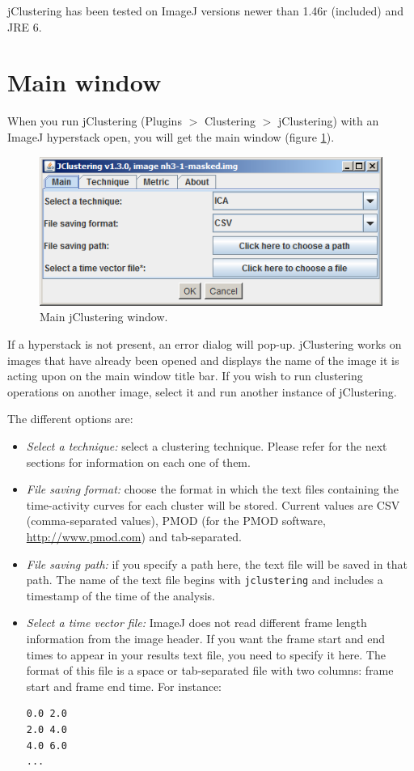 \documentclass[11pt]{article} %
\begin{document}
jClustering has been tested on ImageJ versions newer than 1.46r (included) and JRE 6.

\section{Main window}

When you run jClustering (Plugins $>$ Clustering $>$ jClustering) with an ImageJ hyperstack open, you will get the main
window (figure \ref{fig:main}).

\begin{figure}[h!]
  \centering
    \includegraphics[width=\textwidth]{figures/main_window}
  \caption{Main jClustering window.}
  \label{fig:main}
\end{figure}

If a hyperstack is not present, an error dialog will pop-up. jClustering works on images that have already been opened and
displays the name of the image it is acting upon on the main window title bar. If you wish to run clustering operations on
another image, select it and run another instance of jClustering.

The different options are:

\begin{itemize}
\item {\em Select a technique:} select a clustering technique. Please refer for the next sections for information on each one
of them.
\item {\em File saving format:} choose the format in which the text files containing the time-activity curves for each cluster
will be stored. Current values are CSV (comma-separated values), PMOD (for the PMOD software, \url{http://www.pmod.com})
and tab-separated.
\item {\em File saving path:} if you specify a path here, the text file will be saved in that path. The name of the text file
begins with \texttt{jclustering} and includes a timestamp of the time of the analysis.
\item {\em Select a time vector file:} ImageJ does not read different frame length information from the image header. If you
want the frame start and end times to appear in your results text file, you need to specify it here. The format of this file is a
space or tab-separated file with two columns: frame start and frame end time. For instance:

\begin{verbatim}
0.0	2.0
2.0	4.0
4.0	6.0
...
\end{verbatim}

\end{itemize}
\end{document}
